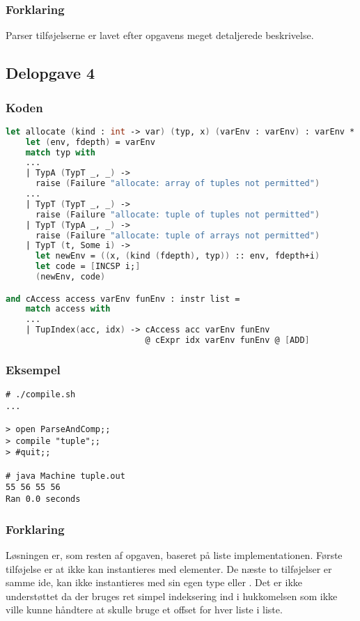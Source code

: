 \subsubsection{Forklaring}
Parser tilføjelserne er lavet efter opgavens meget detaljerede beskrivelse.

\subsection{Delopgave 4}\label{ass:3-4}
\subsubsection{Koden}
\begin{lstlisting}[language=fsharp]
let allocate (kind : int -> var) (typ, x) (varEnv : varEnv) : varEnv * instr list =
    let (env, fdepth) = varEnv 
    match typ with
    ...
    | TypA (TypT _, _) -> 
      raise (Failure "allocate: array of tuples not permitted")
    ...
    | TypT (TypT _, _) -> 
      raise (Failure "allocate: tuple of tuples not permitted")
    | TypT (TypA _, _) -> 
      raise (Failure "allocate: tuple of arrays not permitted")
    | TypT (t, Some i) ->
      let newEnv = ((x, (kind (fdepth), typ)) :: env, fdepth+i)  
      let code = [INCSP i;]
      (newEnv, code)

and cAccess access varEnv funEnv : instr list =
    match access with 
    ...
    | TupIndex(acc, idx) -> cAccess acc varEnv funEnv 
                            @ cExpr idx varEnv funEnv @ [ADD]
\end{lstlisting}

\subsubsection{Eksempel}
\begin{lstlisting}
# ./compile.sh
...

> open ParseAndComp;;
> compile "tuple";;
> #quit;;

# java Machine tuple.out
55 56 55 56
Ran 0.0 seconds
\end{lstlisting}

\subsubsection{Forklaring}
Løsningen er, som resten af opgaven, baseret på liste implementationen. Første tilføjelse er at  ikke kan instantieres med  elementer. De næste to tilføjelser er samme ide,  kan ikke instantieres med sin egen type eller . Det er ikke understøttet da der bruges ret simpel indeksering ind i hukkomelsen som ikke ville kunne håndtere at skulle bruge et offset for hver liste i liste.\\[1ex]


